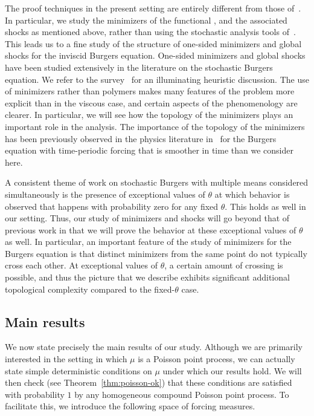 \documentclass[AHL,Unicode,longabstracts]{cedram}
\newcounter{setofcase}
\newcounter{case}[setofcase]
\begin{document}
The proof techniques in the present setting are entirely different from those of~\cite{DG23}. In particular, we study the minimizers of the functional , and the associated shocks as mentioned above, rather than using the stochastic analysis tools of~\cite{DG23}. This leads us to a fine study of the structure of one-sided minimizers and global shocks for the inviscid Burgers equation. One-sided minimizers and global shocks have been studied extensively in the literature on the stochastic Burgers equation. We refer to the survey~\cite{BK18} for an illuminating heuristic discussion. The use of minimizers rather than polymers makes many features of the problem more explicit than in the viscous case, and certain aspects of the phenomenology are clearer. In particular, we will see how the topology of the minimizers plays an important role in the analysis. The importance of the topology of the minimizers has been previously observed in the physics literature in~\cite{BIK02,BK07} for the Burgers equation with time-periodic forcing that is smoother in time than we consider here.

A consistent theme of work on stochastic Burgers with multiple means considered simultaneously is the presence of exceptional values of $\theta$ at which behavior is observed that happens with probability zero for any fixed $\theta$. This holds as well in our setting. Thus, our study of minimizers and shocks will go beyond that of previous work in that we will prove the behavior at these exceptional values of $\theta$ as well. In particular, an important feature of the study of minimizers for the Burgers equation is that distinct minimizers from the same point do not typically cross each other. At exceptional values of $\theta$, a certain amount of crossing is possible, and thus the picture that we describe exhibits significant additional topological complexity compared to the fixed-$\theta$ case.

\subsection{Main results}

We now state precisely the main results of our study. Although we are primarily interested in the setting in which $\mu$ is a Poisson point process, we can actually state simple deterministic conditions on $\mu$ under which our results hold. We will then check (see Theorem~\ref{thm:poisson-ok}) that these conditions are satisfied with probability $1$ by any homogeneous compound Poisson point process. To facilitate this, we introduce the following space of forcing measures.
\end{document}
